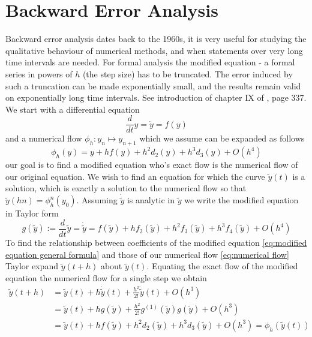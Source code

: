 \documentclass[12pt]{article}
\begin{document}
\section{Backward Error Analysis}

Backward error analysis dates back to the 1960s, it is very useful for studying the qualitative behaviour of numerical methods, and when statements over very long time intervals are needed. For formal analysis the modified equation - a formal series in powers of $h$ (the step size) has to be truncated. The error induced by such a truncation can be made exponentially small, and the results remain valid on exponentially long time intervals. See introduction of chapter IX of \cite{Numerical}, page 337.\\

We start with a differential equation 
\begin{equation}\label{eq:exact equation}
    \frac{d}{dt}y = \dot y = f(y)
\end{equation}
and a numerical flow $\phi_h : y_n\mapsto y_{n+1}$ which we assume can be expanded as follows
\begin{equation}\label{eq:numerical flow}
    \phi_h(y) = y + hf(y) + h^2d_2(y) + h^3d_3(y) + O(h^4)
\end{equation}
our goal is to find a modified equation who's exact flow is the numerical flow of our original equation. We wish to find an equation for which the curve $\widetilde y(t)$ is a solution, which is exactly a solution to the numerical flow so that $\widetilde y(hn) = \phi_h^n(y_0)$. Assuming $\dot{\widetilde y}$ is analytic in $\widetilde y$ we write the modified equation in Taylor form
\begin{equation}\label{eq:modified equation general formula} 
    g(\widetilde y) := \frac{d}{dt}\widetilde y = \dot{\widetilde y} = f(\widetilde y) + hf_2(\widetilde y) + h^2f_3(\widetilde y) + h^3f_4(\widetilde y) + O(h^4)
\end{equation}
To find the relationship between coefficients of the modified equation \eqref{eq:modified equation general formula} and those of our numerical flow \eqref{eq:numerical flow} Taylor expand $\widetilde y(t+h)$ about $\widetilde y(t)$. Equating the exact flow of the modified equation the numerical flow for a single step we obtain
\begin{equation}\label{eq:modified and numerical taylor}
    \begin{split}
    \widetilde y(t+h) &= \widetilde y(t) + h\dot{\widetilde y}(t) + \frac{h^2}{2!} \ddot{\widetilde y}(t) + O(h^3)\\
    &= \widetilde y(t) + hg(\widetilde y) + \frac{h^2}{2!}g^{(1)}(\widetilde y)g(\widetilde y) + O(h^3)\\
    &= \widetilde y(t) + hf(\widetilde y) + h^2d_2(\widetilde y) + h^3d_3(\widetilde y) + O(h^3) = \phi_h(\widetilde y(t))
    \end{split}
\end{equation}
\end{document}
